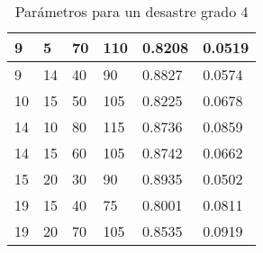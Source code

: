 \begin{table}[H]
\begin{tabular}{|l|l|l|l|l|l|}
9 & 5 & 70 & 110 & 0.8208 & 0.0519 \\ \hline
9 & 14 & 40 & 90 & 0.8827 & 0.0574 \\ \hline
10 & 15 & 50 & 105 & 0.8225 & 0.0678 \\ \hline
14 & 10 & 80 & 115 & 0.8736 & 0.0859 \\ \hline
14 & 15 & 60 & 105 & 0.8742 & 0.0662 \\ \hline
15 & 20 & 30 & 90 & 0.8935 & 0.0502 \\ \hline
19 & 15 & 40 & 75 & 0.8001 & 0.0811 \\ \hline
19 & 20 & 70 & 105 & 0.8535 & 0.0919 \\ \hline
\end{tabular}
\caption{Parámetros para un desastre grado 4}\label{grade4}
\end{table}

